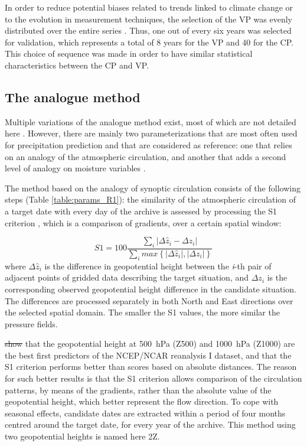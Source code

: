 \documentclass[review]{elsarticle}
\providecommand{\DIFaddtex}[1]{{\protect\color{blue}\uwave{#1}}} %
\providecommand{\DIFdeltex}[1]{{\protect\color{red}\sout{#1}}}                      %
\providecommand{\DIFaddbegin}{} %
\providecommand{\DIFaddend}{} %
\providecommand{\DIFdelbegin}{} %
\providecommand{\DIFdelend}{} %
\providecommand{\DIFadd}[1]{\texorpdfstring{\DIFaddtex{#1}}{#1}} %
\providecommand{\DIFdel}[1]{\texorpdfstring{\DIFdeltex{#1}}{}} %
\begin{document}
In order to reduce potential biases related to trends linked to climate change or to the evolution in measurement techniques, the selection of the VP was evenly distributed over the entire series \citep{BenDaoud2010}. Thus, one out of every six years was selected for validation, which represents a total of 8 years for the VP and 40 for the CP. This choice of sequence was made in order to have similar statistical characteristics between the CP and VP.


\subsection{The analogue method}
\label{sec:references}

Multiple variations of the analogue method exist, most of which are not detailed here \cite[see][for a more comprehensive listing]{BenDaoud2016}. However, there are mainly two parameterizations that are most often used for precipitation prediction and that are considered as reference: one that relies on an analogy of the atmospheric circulation, and another that adds a second level of analogy on moisture variables \citep{Obled2002, Bontron2005, Marty2012}.

The method based on the analogy of synoptic circulation consists of the following steps (Table \ref{table:params_R1}): the similarity of the atmospheric circulation of a target date with every day of the archive is assessed by processing the S1 criterion \citep[Eq.\ \ref{eq:S1}, ][]{Teweles1954, Drosdowsky2003}, which is a comparison of gradients, over a certain spatial window:

\begin{equation}
\label{eq:S1}
S1=100 \frac {\displaystyle \sum_{i} \vert \Delta\hat{z}_{i} - \Delta z_{i} \vert}
{\displaystyle \sum_{i} max\left\lbrace \vert \Delta\hat{z}_{i} \vert , \vert \Delta z_{i} \vert \right\rbrace }
\end{equation}
where $\Delta \hat{z}_{i}$ is the difference in geopotential height between the \textit{i}-th pair of adjacent points of gridded data describing the target situation, and $\Delta z_{i}$ is the corresponding observed geopotential height difference in the candidate situation. The differences are processed separately in both North and East directions over the selected spatial domain. The smaller the S1 values, the more similar the pressure fields.

\citet{Bontron2005} \DIFdelbegin \DIFdel{show }\DIFdelend \DIFaddbegin \DIFadd{showed }\DIFaddend that the geopotential height at 500~hPa (Z500) and 1000~hPa (Z1000) are the best first predictors of the NCEP/NCAR reanalysis I dataset, and that the S1 criterion performs better than scores based on absolute distances. The reason for such better results is that the S1 criterion allows comparison of the circulation patterns, by means of the gradients, rather than the absolute value of the geopotential height, which better represent the flow direction. To cope with seasonal effects, candidate dates are extracted within a period of four months centred around the target date, for every year of the archive. This method using two geopotential heights is named here 2Z.
\end{document}
